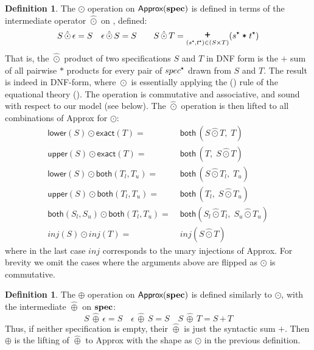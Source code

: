 \documentclass[10pt,preprint]{sigplanconf}
\newcounter{block}
\theoremstyle{definition}
\newtheorem{definition}[block]{Definition}
\newcommand{\term}[1]{\texttt{#1}}
\newcommand{\trule}[1]{{\footnotesize{(\text{#1})}}}
\begin{document}
\begin{definition} The $\odot$ operation on $\textsf{Approx}(\textbf{spec}{})$
  is defined in terms of the intermediate operator $\hat{\odot}$ on
  \specDNF{}, defined:
\begin{align*}
S \,\hat{\odot}\, \epsilon = S \quad
\epsilon \,\hat{\odot}\, S = S \qquad
S \,\hat{\odot}\, T = \bplus_{(\tyProd{s}, \tyProd{t}) \in (S \times
   T)} (\tyProd{s} \; \term{*} \; \tyProd{t})
\end{align*}
That is, the $\hat{\odot}$ product of two specifications $S$ and $T$ in DNF form
is the $\term{+}$ sum of all pairwise $\term{*}$ products for every
pair of $\tyProd{spec}$ drawn from $S$ and $T$. The result
is indeed in DNF-form, where $\hat{\odot}$ is essentially applying
 the \trule{\textsc{dist}} rule of the equational theory
 (). The operation is
commutative and associative, and sound with respect to our
model (see  below).
The $\hat{\odot}$ operation is then lifted to all combinations of
\textsf{Approx} for $\odot$:
\begin{align*}
\textsf{lower}(S) \odot \textsf{exact}(T) = \; &
       \textsf{both} \, (S \hat{\odot} T, \; T) \\
\textsf{upper}(S) \odot \textsf{exact}(T) = \; &
       \textsf{both} \, (T, \; S \hat{\odot} T) \\
\textsf{lower}(S) \odot \textsf{both}(T_l,T_u) = \; &
        \textsf{both} \, (S \hat{\odot} T_l, \; T_u) \\
\textsf{upper}(S) \odot \textsf{both}(T_l,T_u) = \; & \textsf{both} \,
                                                      (T_l, \; S \hat{\odot} T_u) \\
\textsf{both}(S_l,S_u) \odot
\textsf{both}(T_l,T_u)  = \; & \textsf{both} (S_l \hat{\odot} T_l, \; S_u
                         \hat{\odot} T_u) \\
\textit{inj}(S) \odot \textit{inj}(T) = \; & \textit{inj}(S
                                              \hat{\odot} T)
\end{align*}
where in the last case $\textit{inj}$ corresponds to the unary
injections of \textsf{Approx}. For brevity we omit the cases where the arguments above are flipped
as $\odot$ is commutative.
\end{definition}

\begin{definition}The $\oplus$ operation on $\textsf{Approx}(\textbf{spec})$
is defined similarly to $\odot$, with the intermediate $\hat{\oplus}$ on
$\textbf{spec}$:
\begin{equation*}
S \,\hat{\oplus}\, \epsilon = S \quad
\epsilon \,\hat{\oplus}\, S = S \quad
S \, \hat{\oplus} \, T = S \, \term{+} \, T
\end{equation*}
Thus, if neither specification is empty, their $\hat{\oplus}$ is just
the syntactic sum $\term{+}$. Then $\oplus$ is the lifting of
$\hat{\oplus}$ to \textsf{Approx} with the shape as $\odot$ in the previous
definition.
\end{definition}
\end{document}
